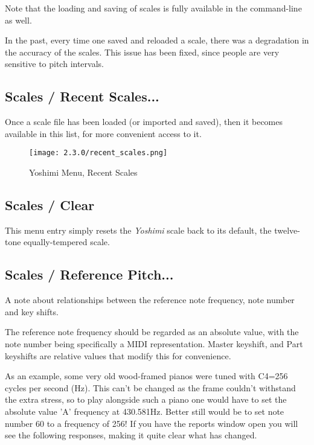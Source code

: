    Note that the loading and saving of scales is fully available in the
   command-line as well.

   In the past, every time one saved and reloaded a scale, there was a
   degradation in the accuracy of the scales.  This issue has been fixed, since
   people are very sensitive to pitch intervals.

\subsection{Scales / Recent Scales...}
\label{subsec:scales_recent_scales}

   Once a scale file has been loaded (or imported and saved), then it
   becomes available in this list, for more convenient access to it.

\begin{figure}[H]
   \centering
   \texttt{[image: 2.3.0/recent\_scales.png]}
   \caption{Yoshimi Menu, Recent Scales}
   \label{fig:yoshimi_recent_scales}
\end{figure}

\subsection{Scales / Clear}
\label{subsec:scales_clear}

   This menu entry simply resets the \textsl{Yoshimi} scale back to its default,
   the twelve-tone equally-tempered scale.

\subsection{Scales / Reference Pitch...}
\label{subsec:scales_reference_pitch}
   A note about relationships between the reference note frequency, note number
   and key shifts.

   The reference note frequency should be regarded as an absolute value, with the
   note number being specifically a MIDI representation.
   Master keyshift, and Part keyshifts are relative values that modify this for
   convenience.

   As an example, some very old wood-framed pianos were tuned with C4=256 cycles
   per second (Hz). This can't be changed as the frame couldn't withstand the
   extra stress, so to play alongside such a piano one would have to set the
   absolute value 'A' frequency at 430.581Hz. Better still would be to set note
   number 60 to a frequency of 256! If you have the reports window open you will see the following responses, making it quite clear what has changed.


